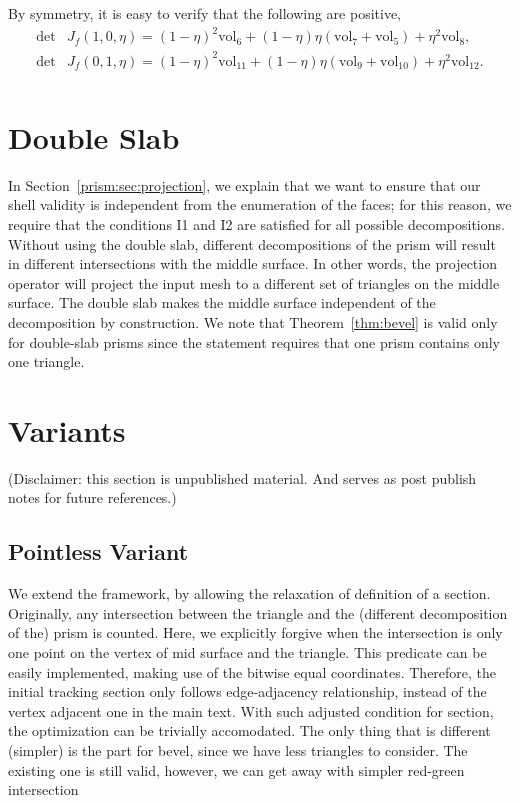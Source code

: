 By symmetry, 
it is easy to verify {that the following are positive},
\begin{align*}
    \det& J_f(1,0,\eta) = (1-\eta)^2 \text{vol}_6 + (1-\eta)\eta (\text{vol}_7 +\text{vol}_5) + \eta^2 \text{vol}_8{,} \\
    \det& J_f(0,1,\eta) = (1-\eta)^2 \text{vol}_{11} + (1-\eta)\eta (\text{vol}_9 +\text{vol}_{10}) + \eta^2 \text{vol}_{12}.\\
\end{align*}


\section{Double Slab}\label{app:dblayer}
In Section~\ref{prism:sec:projection}, we explain that we want to ensure that our shell validity is independent from the enumeration of the faces; for this reason, we require that the conditions I1 and I2 are satisfied for all possible decompositions. Without using the double slab, different decompositions of the prism will result in  different intersections with the middle surface. In other words, the projection operator will project the input mesh to a different set of triangles on the middle surface. 
The double slab makes the middle surface independent of the decomposition by construction. 
We note that Theorem~\ref{thm:bevel} is valid only for double-slab prisms since the statement requires that one prism contains only one triangle.

\section{Variants}
(Disclaimer: this section is unpublished material. And serves as post publish notes for future references.)
\subsection{Pointless Variant}
We extend the framework, by allowing the relaxation of definition of a section. 
Originally, any intersection between the triangle and the (different decomposition of the) prism is counted. Here, we explicitly forgive when the intersection is only one point on the vertex of mid surface and the triangle. 
This predicate can be easily implemented, making use of the bitwise equal coordinates.
Therefore, the initial tracking section only follows edge-adjacency relationship, instead of the vertex adjacent one in the main text. 
With such adjusted condition for section, the optimization can be trivially accomodated. The only thing that is different (simpler) is the part for bevel, since we have less triangles to consider.
The existing one is still valid, however, we can get away with simpler red-green intersection

